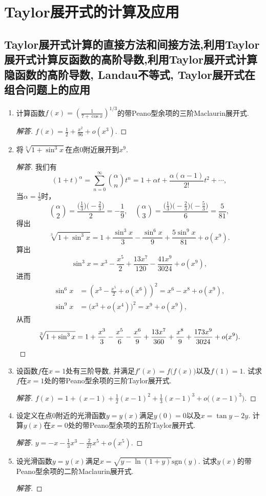 \section{Taylor展开式的计算及应用}
\subsection{Taylor展开式计算的直接方法和间接方法,利用Taylor展开式计算反函数的高阶导数,利用Taylor展开式计算隐函数的高阶导数, Landau不等式, Taylor展开式在组合问题上的应用}
\begin{6a}
\begin{enumerate}
\item 计算函数\(f(x)=\left(\frac{1}{7+\cos x}\right)^{1/3}\)的带Peano型余项的三阶Maclaurin展开式.
\begin{proof}[解答]
\(f(x)=\frac{1}{2}+\frac{x^2}{96}+o(x^3)\).
\end{proof}
\item 将\(\sqrt[3]{1+\sin^3x}\)在点\(0\)附近展开到\(x^9\).
\begin{proof}[解答]
我们有
\[(1+t)^\alpha=\sum_{n=0}^{\infty}\binom{\alpha}{n}t^n
=1+\alpha t+\frac{\alpha(\alpha-1)}{2!}t^2+\cdots,\]
当$\alpha=\frac{1}{3}$时，
\[\binom{\alpha}{2}=\frac{\big(\frac{1}{3}\big)\big(\!-\!\frac{2}{3}\big)}{2}=-\frac{1}{9},
\quad\binom{\alpha}{3}=\frac{\big(\frac{1}{3}\big)\big(\!-\!\frac{2}{3}\big)\big(\!-\!\frac{5}{3}\big)}{6}=\frac{5}{81},\]
得出
\[\sqrt[3]{1+\sin^3x}=1+\frac{\sin^3x}{3}-\frac{\sin^6x}{9}+\frac{5\sin^9x}{81}+o(x^9).\]
算出
\[\sin^3x=x^3-\frac{x^5}{2}+\frac{13x^7}{120}-\frac{41x^9}{3024}+o(x^9),\]
进而
\begin{align*}
    \sin^6x&=\left(x^3-\frac{x^5}{2}+o(x^6)\right)^2=x^6-x^8+o(x^9),\\
    \sin^9x&=\big(x^3+o(x^4)\big)^2=x^9+o(x^9),
\end{align*}
从而
\[\sqrt[3]{1+\sin^3x}=1+\frac{x^3}{3}-\frac{x^5}{6}-\frac{x^6}{9}
+\frac{13x^7}{360}+\frac{x^8}{9}+\frac{173x^9}{3024}+o(x^9).\qedhere\]
\end{proof}
\item 设函数\(f\)在\(x=1\)处有三阶导数, 并满足\(f'(x)=f\big(f(x)\big)\)以及\(f(1)=1\). 
试求\(f\)在\(x=1\)处的带Peano型余项的三阶Taylor展开式.
\begin{proof}[解答]
\(f(x)=1+(x-1)+\frac{1}{2}(x-1)^2+\frac{1}{3}(x-1)^3+o\big((x-1)^3\big)\).
\end{proof}
\item 设定义在点\(0\)附近的光滑函数\(y=y(x)\)满足\(y(0)=0\)以及\(x=\tan y-2y\). 
计算\(y(x)\)在\(x=0\)处的带Peano型余项的五阶Taylor展开式.
\begin{proof}[解答]
\(y=-x-\frac{1}{3}x^3-\frac{2}{27}x^5+o(x^5)\).
\end{proof}
\item 设光滑函数\(y=y(x)\)满足\(x=\sqrt{y-\ln(1+y)}\mathrm{sgn}(y)\). 
试求\(y(x)\)的带Peano型余项的二阶Maclaurin展开式.
\begin{proof}[解答]


\end{proof}
\end{enumerate}
\end{6a}
